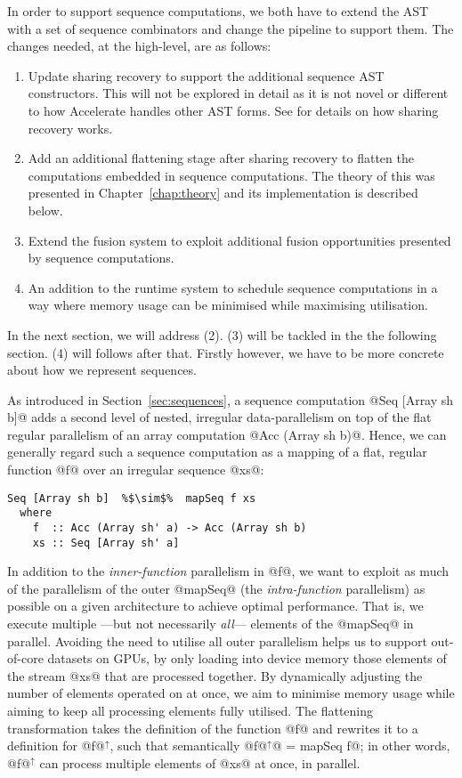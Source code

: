 In order to support sequence computations, we both have to extend the AST with a set of sequence combinators and change the pipeline to support them. The changes needed, at the high-level, are as follows:
%
\begin{enumerate}
%
\item Update sharing recovery to support the additional sequence AST constructors. This will not be explored in detail as it is not novel or different to how Accelerate handles other AST forms. See \citet{McDonell:acc-optim} for details on how sharing recovery works.
%
\item Add an additional flattening stage after sharing recovery to flatten the computations embedded in sequence computations. The theory of this was presented in Chapter~\ref{chap:theory} and its implementation is described below.
%
\item Extend the fusion system to exploit additional fusion opportunities presented by sequence computations.
%
\item An addition to the runtime system to schedule sequence computations in a way where memory usage can be minimised while maximising utilisation.
%
\end{enumerate}

In the next section, we will address (2). (3) will be tackled in the the following section. (4) will follows after that. Firstly however, we have to be more concrete about how we represent sequences.


As introduced in Section~\ref{sec:sequences}, a sequence computation @Seq [Array sh b]@ adds a second level of nested, irregular data-parallelism on top of the flat regular parallelism of an array computation @Acc (Array sh b)@. Hence, we can generally regard such a sequence computation as a mapping of a flat, regular function @f@ over an irregular sequence @xs@:
%
\begin{lstlisting}
Seq [Array sh b]  %$\sim$%  mapSeq f xs
  where
    f  :: Acc (Array sh' a) -> Acc (Array sh b)
    xs :: Seq [Array sh' a]
\end{lstlisting}
%
In addition to the \emph{inner-function} parallelism in @f@, we want to
exploit as much of the parallelism of the outer @mapSeq@ (the \emph{intra-function} parallelism) as possible on a
given architecture to achieve optimal performance. That is, we execute multiple ---but not necessarily \emph{all}--- elements of the @mapSeq@ in
parallel. Avoiding the need to utilise all outer parallelism helps us to support out-of-core datasets on GPUs, by only loading into
device memory those elements of the stream @xs@ that are processed together. By
dynamically adjusting the number of elements operated on at once, we aim to
minimise memory usage while aiming to keep all processing elements fully utilised. The flattening transformation takes the definition of the function @f@ and rewrites it to a definition for @f@$^\uparrow$, such that semantically @f@$^\uparrow$@ = mapSeq f@; in other words, @f@$^\uparrow$ can process multiple elements of @xs@ at once, in parallel.

